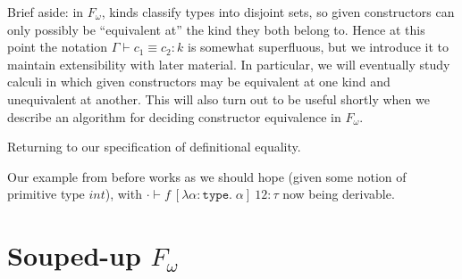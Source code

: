 \documentclass{article}
\newcommand{\type}{\ensuremath{\mathtt{type}}}
\begin{document}
Brief aside: in $F_\omega$, kinds classify types into disjoint sets, so given constructors can only possibly be ``equivalent at'' the kind they both belong to. Hence at this point the notation $\Gamma \vdash c_1 \equiv c_2 : k$ is somewhat superfluous, but we introduce it to maintain extensibility with later material. In particular, we will eventually study calculi in which given constructors may be equivalent at one kind and unequivalent at another. This will also turn out to be useful shortly when we describe an algorithm for deciding constructor equivalence in $F_\omega$.

Returning to our specification of definitional equality.


Our example from before works as we should hope (given some notion of primitive type $int$), with $\cdot \vdash f \ [\lambda \alpha : \type. \; \alpha] \ 12 : \tau$ now being derivable.

\section{Souped-up $F_\omega$}
\end{document}
